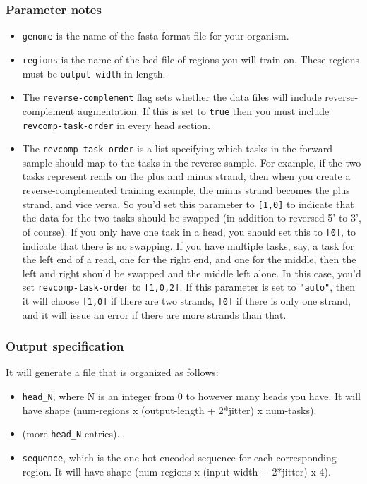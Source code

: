\documentclass{article}
\begin{document}
\subsubsection{Parameter notes}
\begin{itemize}
    \item \texttt{genome} is the name of the fasta-format file for your organism. 
    \item \texttt{regions} is the name of the bed file of regions you will train on. These regions must be \texttt{output-width} in length. 
    \item The \texttt{reverse-complement} flag sets whether the data files will include reverse-complement augmentation. 
        If this is set to \texttt{true} then you must include \texttt{revcomp-task-order} in every head section.
    \item The \texttt{revcomp-task-order} is a list specifying which tasks in the forward sample should map to the tasks in the reverse sample.
        For example, if the two tasks represent reads on the plus and minus strand, then when you create a reverse-complemented training example, the minus strand becomes the plus strand, and vice versa.
        So you'd set this parameter to \texttt{[1,0]} to indicate that the data for the two tasks should be swapped (in addition to reversed 5' to 3', of course).
        If you only have one task in a head, you should set this to \texttt{[0]}, to indicate that there is no swapping.
        If you have multiple tasks, say, a task for the left end of a read, one for the right end, and one for the middle, then the left and right should be swapped and the middle left alone.
        In this case, you'd set \texttt{revcomp-task-order} to \texttt{[1,0,2]}.
        If this parameter is set to \texttt{"auto"}, then it will choose \texttt{[1,0]} if there are two strands, \texttt{[0]} if there is only one strand, and it will issue an error if there are more strands than that.
\end{itemize}

\subsubsection{Output specification}

It will generate a file that is organized as follows:

\begin{itemize}
    \item \texttt{head\_N}, where N is an integer from 0 to however many heads you have. It will have shape (num-regions x (output-length + 2*jitter) x num-tasks).
    \item (more \texttt{head\_N} entries)...
    \item \texttt{sequence}, which is the one-hot encoded sequence for each corresponding region. It will have shape (num-regions x (input-width + 2*jitter) x 4).
\end{itemize}
\end{document}
